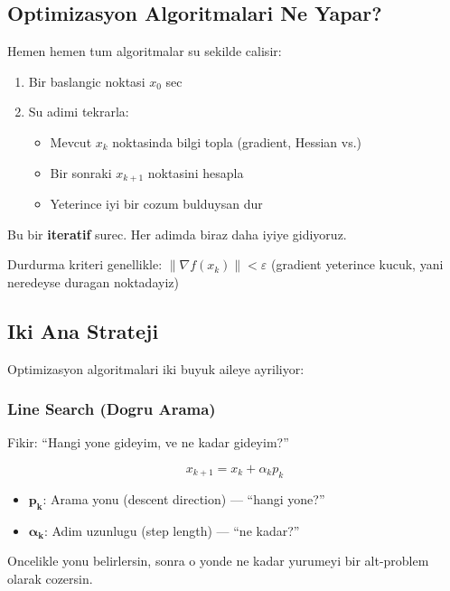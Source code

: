 \documentclass[12pt,a4paper]{article}
\theoremstyle{definition}
\theoremstyle{remark}
\begin{document}
\subsection{Optimizasyon Algoritmalari Ne Yapar?}

Hemen hemen tum algoritmalar su sekilde calisir:

\begin{enumerate}[leftmargin=*, itemsep=0.2em]
\item Bir baslangic noktasi $x_0$ sec
\item Su adimi tekrarla:
  \begin{itemize}[leftmargin=*, itemsep=0.1em]
  \item Mevcut $x_k$ noktasinda bilgi topla (gradient, Hessian vs.)
  \item Bir sonraki $x_{k+1}$ noktasini hesapla
  \item Yeterince iyi bir cozum bulduysan dur
  \end{itemize}
\end{enumerate}

Bu bir \textbf{iteratif} surec. Her adimda biraz daha iyiye gidiyoruz.

Durdurma kriteri genellikle: $\|\nabla f(x_k)\| < \varepsilon$ (gradient yeterince kucuk, yani neredeyse duragan noktadayiz)

\subsection{Iki Ana Strateji}

Optimizasyon algoritmalari iki buyuk aileye ayriliyor:

\subsubsection{Line Search (Dogru Arama)}

Fikir: ``Hangi yone gideyim, ve ne kadar gideyim?''

\[
x_{k+1} = x_k + \alpha_k p_k
\]

\begin{itemize}[leftmargin=*, itemsep=0.2em]
\item $\mathbf{p_k}$: Arama yonu (descent direction) --- ``hangi yone?''
\item $\boldsymbol{\alpha_k}$: Adim uzunlugu (step length) --- ``ne kadar?''
\end{itemize}

Oncelikle yonu belirlersin, sonra o yonde ne kadar yurumeyi bir alt-problem olarak cozersin.
\end{document}
